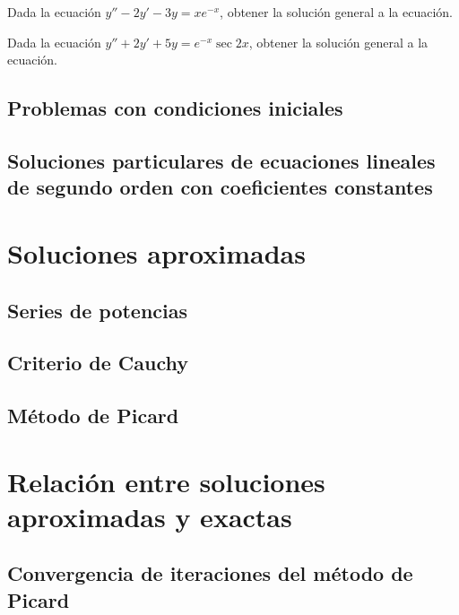 		\begin{ejercicio}
			Dada la ecuación $y'' - 2 y' - 3 y = x e^{-x}$, obtener la solución general a la ecuación.
		\end{ejercicio}

		\begin{ejercicio}
			Dada la ecuación $y'' + 2 y' + 5 y = e^{-x} \sec{2x}$, obtener la solución general a la ecuación.
		\end{ejercicio}

	\newpage
	\subsection{Problemas con condiciones iniciales}

	\newpage
	\subsection{Soluciones particulares de ecuaciones lineales de segundo orden con coeficientes constantes}

\newpage
\section{Soluciones aproximadas}

	\subsection{Series de potencias}

	\newpage
	\subsection{Criterio de Cauchy}

	\newpage
	\subsection{Método de Picard}

\newpage
\section{Relación entre soluciones aproximadas y exactas}

	\subsection{Convergencia de iteraciones del método de Picard}
